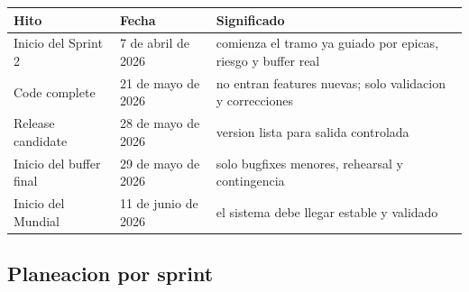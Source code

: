 \begin{longtable}{p{}p{}p{}}
\toprule
\textbf{Hito} & \textbf{Fecha} & \textbf{Significado} \\
\midrule
Inicio del Sprint 2 & 7 de abril de 2026 & comienza el tramo ya guiado por epicas, riesgo y buffer real \\
Code complete & 21 de mayo de 2026 & no entran features nuevas; solo validacion y correcciones \\
Release candidate & 28 de mayo de 2026 & version lista para salida controlada \\
Inicio del buffer final & 29 de mayo de 2026 & solo bugfixes menores, rehearsal y contingencia \\
Inicio del Mundial & 11 de junio de 2026 & el sistema debe llegar estable y validado \\
\bottomrule
\end{longtable}

\subsection{Planeacion por sprint}

